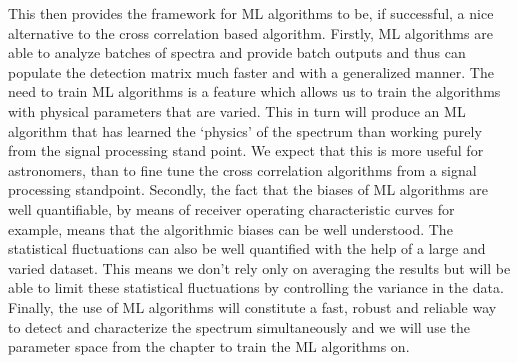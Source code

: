 This then provides the framework for ML algorithms to be, if successful, a nice alternative to the cross correlation based algorithm.
Firstly, ML algorithms are able to analyze batches of spectra and provide batch outputs and thus can populate the detection matrix much faster and with a generalized manner.
The need to train ML algorithms is a feature which allows us to train the algorithms with physical parameters that are varied.
This in turn will produce an ML algorithm that has learned the `physics' of the spectrum than working purely from the signal processing stand point.
We expect that this is more useful for astronomers, than to fine tune the cross correlation algorithms from a signal processing standpoint.
Secondly, the fact that the biases of ML algorithms are well quantifiable, by means of receiver operating characteristic curves for example, means that the algorithmic biases can be well understood. 
The statistical fluctuations can also be well quantified  with the help of a large and varied dataset.
This means we don't rely only on averaging the results but will be able to limit these statistical fluctuations by controlling the variance in the data.
Finally, the use of ML algorithms will constitute a fast, robust and reliable way to detect and characterize the spectrum simultaneously and we will use the parameter space from the chapter to train the ML algorithms on.
